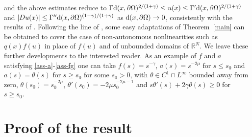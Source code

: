 \documentclass[10pt]{amsart}
\numberwithin{equation}{section}
\theoremstyle{definition}
\newcommand{\R}{{\mathbb R}}
\begin{document}
and the above estimates reduce to $\Gamma{\rm d}(x,\partial\Omega)^{2/(1+\gamma)}\leq u(x)\leq \Gamma'
{\rm d}(x,\partial\Omega)^{2/(1+\gamma)}$ and $|Du(x)|\leq \Gamma''{\rm d}(x,\partial\Omega)^{(1-\gamma)/(1+\gamma)}$
as ${\rm d}(x,\partial\Omega)\to 0$, consistently with the results of \cite{craRabTar,zhangcheng}.
Following the line of \cite{lairshak,zhangcheng}, some easy adaptations 
of Theorem~\ref{main} can be obtained to cover the case of non-autonomous nonlinearities
such as $q(x)f(u)$ in place of $f(u)$ and of unbounded domains of $\R^N$. We leave these further 
developments to the interested reader.
As an example of $f$ and $a$ satisfying \eqref{ass-a}-\eqref{ass-fg} one can take
$f(s)=s^{-\gamma}$, $a(s)=s^{-2\mu}$ for $s\leq s_0$ and $a(s)=\theta(s)$ for $s\geq s_0$
for some $s_0>0$, with $\theta\in C^1\cap L^\infty$ bounded away from zero, 
$\theta(s_0)=s_0^{-2\mu}$, $\theta'(s_0)=-2\mu s_0^{-2\mu-1}$
and $s\theta'(s)+2\gamma \theta(s)\geq 0$ for $s\geq s_0$.



\section{Proof of the result}
\noindent
\end{document}
